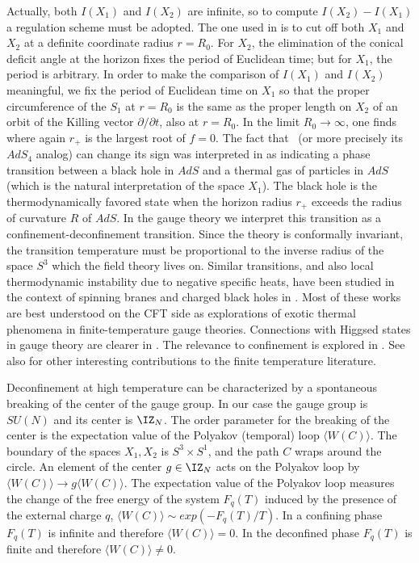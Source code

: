 Actually, both $I(X_1)$ and $I(X_2)$ are infinite, so to compute
$I(X_2)-I(X_1)$ a regulation scheme must be adopted.  The one used in
\cite{Witten:1998zw,Gubser:1998nz} is to cut off both
$X_1$ and $X_2$ at a definite coordinate radius $r=R_0$.  For $X_2$, the
elimination of the conical deficit angle at the horizon fixes the period of
Euclidean time; but for $X_1$, the period is arbitrary.  In order to make
the comparison of $I(X_1)$ and $I(X_2)$ meaningful, we fix the period of
Euclidean time on $X_1$ so that the proper circumference of the $S_1$ at
$r=R_0$ is the same as the proper length on $X_2$ of an orbit of the Killing
vector $\partial/\partial t$, also at $r=R_0$.  In the limit $R_0\to\infty$,
one finds
 where again $r_+$ is the largest root of $f=0$.  The fact that \IDiff\ (or
more precisely its $AdS_4$ analog) can change its sign was interpreted in
\cite{Hawking:1983dh} as indicating a phase transition between a black hole
in $AdS$ and a thermal gas of particles in $AdS$ (which is the natural
interpretation of the space $X_1$).  The black hole is the
thermodynamically favored state when the horizon radius $r_+$ exceeds the
radius of curvature $R$ of $AdS$. In the gauge theory we interpret this
transition as a confinement-deconfinement transition.  Since the theory is
conformally invariant, the transition temperature must be proportional to
the inverse radius of the space $S^3$ which the field theory lives on.
Similar transitions, and also local thermodynamic instability due to
negative specific heats, have been studied in the context of spinning
branes and charged black holes in
\cite{Gubser:1998jb,Landsteiner:1999gb,Cai:1998ji,
Cvetic:1999ne,Chamblin:1999tk,Cvetic:1999rb,Caldarelli:1999ar}.  Most of
these works are best understood on the CFT side as explorations of exotic
thermal phenomena in finite-temperature gauge theories.  Connections with
Higgsed states in gauge theory are clearer in
\cite{Kraus:1998hv,Tseytlin:1998cq}.  The relevance to confinement is
explored in \cite{Cvetic:1999rb}.  See also
\cite{Birmingham:1998nr,Louko:1998hc,Hawking:1998kw,Peet:1998cr} for other
interesting contributions to the finite temperature literature.

Deconfinement at high temperature can be characterized by a spontaneous
breaking of the center of the gauge group. In our case the gauge group is
$SU(N)$ and its center is $\IZ_N$.
The order parameter for the breaking of the center is the
expectation value of the Polyakov (temporal) loop $\langle W(C) \rangle$.
The boundary of the spaces $X_1,X_2$ is $S^3 \times S^1$, and 
the path $C$ wraps around the circle.
An element of the center $g \in \IZ_N$ acts on the Polyakov loop
by  $\langle W(C) \rangle \rightarrow g \langle W(C) \rangle$.
The expectation value of the Polyakov loop measures the change of the
free energy of the system $F_q(T)$ induced by the presence
of the external charge $q$, 
$\langle W(C) \rangle \sim exp \left(-F_q(T)/T \right)$.
In a confining phase  $F_q(T)$ is infinite and therefore  
$\langle W(C) \rangle  = 0$.
In the deconfined phase  $F_q(T)$ is finite and therefore  
$\langle W(C) \rangle  \neq 0$.

